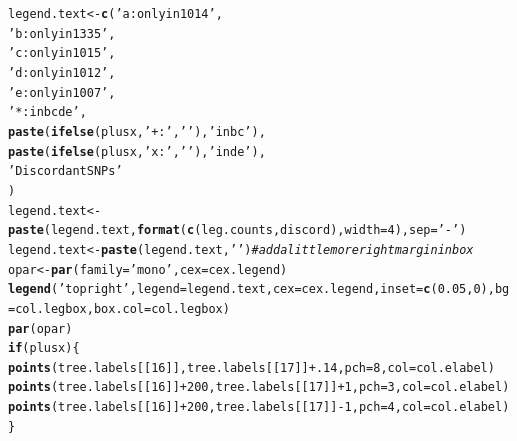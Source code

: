 \documentclass{article}\usepackage[]{graphicx}\usepackage[]{color}
\makeatletter
\newcommand{\hlnum}[1]{\textcolor[rgb]{0.686,0.059,0.569}{#1}}%
\newcommand{\hlstr}[1]{\textcolor[rgb]{0.192,0.494,0.8}{#1}}%
\newcommand{\hlcom}[1]{\textcolor[rgb]{0.678,0.584,0.686}{\textit{#1}}}%
\newcommand{\hlopt}[1]{\textcolor[rgb]{0,0,0}{#1}}%
\newcommand{\hlstd}[1]{\textcolor[rgb]{0.345,0.345,0.345}{#1}}%
\newcommand{\hlkwa}[1]{\textcolor[rgb]{0.161,0.373,0.58}{\textbf{#1}}}%
\newcommand{\hlkwb}[1]{\textcolor[rgb]{0.69,0.353,0.396}{#1}}%
\newcommand{\hlkwc}[1]{\textcolor[rgb]{0.333,0.667,0.333}{#1}}%
\newcommand{\hlkwd}[1]{\textcolor[rgb]{0.737,0.353,0.396}{\textbf{#1}}}%
\newenvironment{kframe}{%
 \def\at@end@of@kframe{}%
 \ifinner\ifhmode%
  \def\at@end@of@kframe{\end{minipage}}%
  \begin{minipage}{\columnwidth}%
 \fi\fi%
 \def\FrameCommand##1{\hskip\@totalleftmargin \hskip-\fboxsep
 \colorbox{shadecolor}{##1}\hskip-\fboxsep
     \hskip-\linewidth \hskip-\@totalleftmargin \hskip\columnwidth}%
 \MakeFramed {\advance\hsize-\width
   \@totalleftmargin\z@ \linewidth\hsize
   \@setminipage}}%
 {\par\unskip\endMakeFramed%
 \at@end@of@kframe}
\newenvironment{knitrout}{}{} %
\makeatother
\begin{document}
\begin{knitrout}
\begin{kframe}
\begin{alltt}
  \hlstd{legend.text} \hlkwb{<-} \hlkwd{c}\hlstd{(}\hlstr{'a: only in 1014 '}\hlstd{,}
                   \hlstr{'b: only in 1335 '}\hlstd{,}
                   \hlstr{'c: only in 1015 '}\hlstd{,}
                   \hlstr{'d: only in 1012 '}\hlstd{,}
                   \hlstr{'e: only in 1007 '}\hlstd{,}
                   \hlstr{'*: in bcde      '}\hlstd{,}
                   \hlkwd{paste}\hlstd{(}\hlkwd{ifelse}\hlstd{(plusx,}\hlstr{'+:'}\hlstd{,}\hlstr{'  '}\hlstd{),}\hlstr{'in bc        '}\hlstd{),}
                   \hlkwd{paste}\hlstd{(}\hlkwd{ifelse}\hlstd{(plusx,}\hlstr{'x:'}\hlstd{,}\hlstr{'  '}\hlstd{),}\hlstr{'in de        '}\hlstd{),}
                   \hlstr{'Discordant SNPs '}
  \hlstd{)}
  \hlstd{legend.text} \hlkwb{<-} \hlkwd{paste}\hlstd{(legend.text,}\hlkwd{format}\hlstd{(}\hlkwd{c}\hlstd{(leg.counts,discord),}\hlkwc{width}\hlstd{=}\hlnum{4}\hlstd{),}\hlkwc{sep}\hlstd{=}\hlstr{' - '}\hlstd{)}
  \hlstd{legend.text} \hlkwb{<-} \hlkwd{paste}\hlstd{(legend.text,}\hlstr{' '}\hlstd{)} \hlcom{# add a little more right margin in box}
  \hlstd{opar} \hlkwb{<-} \hlkwd{par}\hlstd{(}\hlkwc{family}\hlstd{=}\hlstr{'mono'}\hlstd{,}\hlkwc{cex}\hlstd{=cex.legend)}
  \hlkwd{legend}\hlstd{(}\hlstr{'topright'}\hlstd{,} \hlkwc{legend}\hlstd{=legend.text,} \hlkwc{cex}\hlstd{=cex.legend,} \hlkwc{inset}\hlstd{=}\hlkwd{c}\hlstd{(}\hlnum{0.05}\hlstd{,}\hlnum{0}\hlstd{),} \hlkwc{bg}\hlstd{=col.legbox,} \hlkwc{box.col}\hlstd{=col.legbox)}
  \hlkwd{par}\hlstd{(opar)}
  \hlkwa{if}\hlstd{(plusx)\{}
    \hlkwd{points}\hlstd{(tree.labels[[}\hlnum{16}\hlstd{]],tree.labels[[}\hlnum{17}\hlstd{]]}\hlopt{+}\hlnum{.14}\hlstd{,}\hlkwc{pch}\hlstd{=}\hlnum{8}\hlstd{,}\hlkwc{col}\hlstd{=col.elabel)}
    \hlkwd{points}\hlstd{(tree.labels[[}\hlnum{16}\hlstd{]]}\hlopt{+}\hlnum{200}\hlstd{,tree.labels[[}\hlnum{17}\hlstd{]]}\hlopt{+}\hlnum{1}\hlstd{,}\hlkwc{pch}\hlstd{=}\hlnum{3}\hlstd{,}\hlkwc{col}\hlstd{=col.elabel)}
    \hlkwd{points}\hlstd{(tree.labels[[}\hlnum{16}\hlstd{]]}\hlopt{+}\hlnum{200}\hlstd{,tree.labels[[}\hlnum{17}\hlstd{]]}\hlopt{-}\hlnum{1}\hlstd{,}\hlkwc{pch}\hlstd{=}\hlnum{4}\hlstd{,}\hlkwc{col}\hlstd{=col.elabel)}
  \hlstd{\}}


\end{alltt}
\end{kframe}
\end{knitrout}
\end{document}
